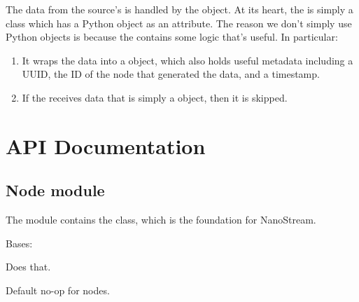 \documentclass[letterpaper,10pt,english]{sphinxmanual}
\begin{document}
The data from the source’s  is handled by the  object. At its heart, the  is simply a class which has a Python  object as an attribute. The reason we don’t simply use Python  objects is because the  contains some logic that’s useful. In particular:
\begin{enumerate}
\def\theenumi{\arabic{enumi}}
\def\labelenumi{\theenumi .}
\makeatletter\def\p@enumii{\p@enumi \theenumi .}\makeatother
\item {} 
It wraps the data into a  object, which also holds useful metadata including a UUID, the ID of the node that generated the data, and a timestamp.

\item {} 
If the  receives data that is simply a  object, then it is skipped.

\end{enumerate}


\chapter{API Documentation}
\label{\detokenize{api:module-nanostream.node}}\label{\detokenize{api:api-documentation}}\label{\detokenize{api::doc}}

\section{Node module}
\label{\detokenize{api:node-module}}
The  module contains the  class, which is the foundation
for NanoStream.

\begin{fulllineitems}
\label{\detokenize{api:nanostream.node.AggregateValues}}
Bases: {\hyperref[\detokenize{api:nanostream.node.NanoNode}]{}}

Does that.

\begin{fulllineitems}
\label{\detokenize{api:nanostream.node.AggregateValues.process_item}}
Default no-op for nodes.

\end{fulllineitems}


\end{fulllineitems}
\end{document}
